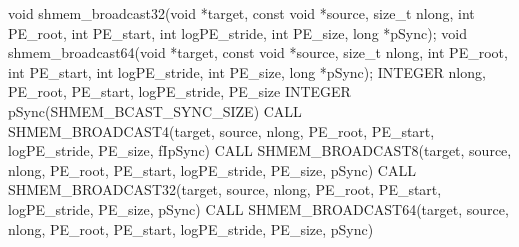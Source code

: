 \synC   %
void shmem_broadcast32(void *target, const void *source, size_t nlong, int PE_root, int PE_start, int logPE_stride, int PE_size, long *pSync);
void shmem_broadcast64(void *target, const void *source, size_t nlong, int PE_root, int PE_start, int logPE_stride, int PE_size, long *pSync);
\synF   %
INTEGER nlong, PE_root, PE_start, logPE_stride, PE_size
INTEGER pSync(SHMEM_BCAST_SYNC_SIZE)
CALL SHMEM_BROADCAST4(target, source, nlong, PE_root, PE_start, logPE_stride, PE_size, fIpSync)
CALL SHMEM_BROADCAST8(target, source, nlong, PE_root, PE_start, logPE_stride, PE_size, pSync)
CALL SHMEM_BROADCAST32(target, source, nlong, PE_root, PE_start, logPE_stride, PE_size, pSync)
CALL SHMEM_BROADCAST64(target, source, nlong, PE_root, PE_start, logPE_stride, PE_size, pSync)

